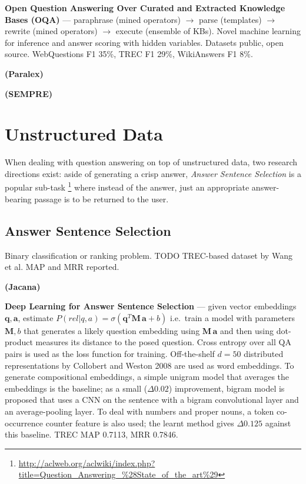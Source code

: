 \textbf{Open Question Answering Over Curated and Extracted Knowledge Bases (OQA)} \cite{OQA}
	--- paraphrase (mined operators) $\to$ parse (templates) $\to$ rewrite (mined operators) $\to$ execute (ensemble of KBs).
	Novel machine learning for inference and answer scoring with hidden variables.
	Datasets public, open source.
	WebQuestions F1 35\%, TREC F1 29\%, WikiAnswers F1 8\%.

\textbf{(Paralex)} \cite{Fader2013Paraphrase}

\textbf{(SEMPRE)} \cite{SPBerant2014Paraphrase}

\section{Unstructured Data}

When dealing with question answering on top of unstructured data,
two research directions exist: aside of generating a crisp answer,
\textit{Answer Sentence Selection} is a popular sub-task%
\footnote{\url{http://aclweb.org/aclwiki/index.php?title=Question_Answering_\%28State_of_the_art\%29}}
where instead of the answer, just an appropriate answer-bearing passage
is to be returned to the user.

\subsection{Answer Sentence Selection}

Binary classification or ranking problem.
TODO TREC-based dataset by Wang et al.
MAP and MRR reported.

\textbf{(Jacana)} \cite{TreeEdit2013Yao}

\textbf{Deep Learning for Answer Sentence Selection} \cite{Yu2014Deep}
	--- given vector embeddings $\mathbf{q}, \mathbf{a}$, estimate
	$P(rel|q,a) = \sigma(\mathbf{q}^T \mathbf{M}\, \mathbf{a} + b)$
	i.e.\ train a model with parameters $\mathbf{M}, b$ that
	generates a likely question embedding using $\mathbf{M}\, \mathbf{a}$
	and then using dot-product measures its distance to the posed question.
	Cross entropy over all QA pairs is used as the loss function for training.
	Off-the-shelf $d=50$ distributed representations by Collobert and Weston 2008
	are used as word embeddings.
	To generate compositional embeddings,
	a simple unigram model that averages the embeddings is the baseline;
	as a small ($\Delta 0.02$) improvement, bigram model is proposed that uses a CNN
	on the sentence with a bigram convolutional layer and an average-pooling layer.
	To deal with numbers and proper nouns, a token co-occurrence counter
	feature is also used; the learnt method gives $\Delta 0.125$ against this baseline.
	TREC MAP 0.7113, MRR 0.7846.

